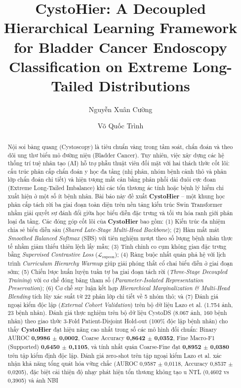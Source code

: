 \documentclass[runningheads]{llncs}
\begin{document}
%
\title{CystoHier: A Decoupled Hierarchical Learning Framework for Bladder Cancer Endoscopy Classification on Extreme Long-Tailed Distributions}
%
%
\author{Nguyễn Xuân Cường \and
Võ Quốc Trình}
%
%
%
\maketitle              %
%
\begin{abstract}
Nội soi bàng quang (Cystoscopy) là tiêu chuẩn vàng trong tầm soát, chẩn đoán và theo dõi ung thư biểu mô đường niệu (Bladder Cancer). Tuy nhiên, việc xây dựng các hệ thống trí tuệ nhân tạo (AI) hỗ trợ phẫu thuật viên đối mặt với hai thách thức cốt lõi: cấu trúc phân cấp chẩn đoán y học đa tầng (nhị phân, nhóm bệnh cảnh thô và phân lớp chẩn đoán chi tiết) và hiện tượng mất cân bằng phân phối dài đuôi cực đoan (Extreme Long-Tailed Imbalance) khi các tổn thương ác tính hoặc bệnh lý hiếm chỉ xuất hiện ở một số ít bệnh nhân. Bài báo này đề xuất \textbf{CystoHier} -- một khung học phân cấp tách rời ba giai đoạn toàn diện trên nền tảng kiến trúc Swin Transformer nhằm giải quyết sự đánh đổi giữa học biểu diễn đặc trưng và tối ưu hóa ranh giới phân loại đa tầng. Các đóng góp cốt lõi của \textbf{CystoHier} bao gồm: (1) Kiến trúc đa nhiệm chia sẻ biểu diễn sâu (\textit{Shared Late-Stage Multi-Head Backbone}); (2) Hàm mất mát \textit{Smoothed Balanced Softmax} (SBS) với tiên nghiệm mượt theo số lượng bệnh nhân thực tế nhằm giảm thiểu thiên lệch lấy mẫu; (3) Tinh chỉnh co cụm không gian đặc trưng bằng \textit{Supervised Contrastive Loss} ($\mathcal{L}_{\text{supcon}}$); (4) Ràng buộc nhất quán phả hệ với lịch trình \textit{Curriculum Hierarchy Warmup} giúp giải phóng thắt cổ chai biểu diễn ở giai đoạn sớm; (5) Chiến lược huấn luyện tuần tự ba giai đoạn tách rời (\textit{Three-Stage Decoupled Training}) với cơ chế đóng băng tham số (\textit{Parameter-Isolated Representation Preservation}); (6) Cơ chế suy luận kết hợp \textit{Hierarchical Marginalization \& Multi-Head Blending} tích lũy xác suất từ 22 phân lớp chi tiết về 5 nhóm thô; và (7) Đánh giá ngoại kiểm độc lập (\textit{External Cohort Validation}) trên bộ dữ liệu Lazo et al. (1.754 ảnh, 23 bệnh nhân). Đánh giá thực nghiệm trên bộ dữ liệu CystoDS (8.067 ảnh, 160 bệnh nhân) theo giao thức 3-Fold Patient-Disjoint Hold-out (100\% độc lập bệnh nhân) cho thấy \textbf{CystoHier} đạt hiệu năng cao nhất trong số các mô hình đối chuẩn: Binary AUROC \textbf{0,9986 $\pm$ 0,0002}, Coarse Accuracy \textbf{0,8642 $\pm$ 0,0352}, Fine Macro-F1 (Supported) \textbf{0,6450 $\pm$ 0,1105}, và tính nhất quán Coarse-Fine đạt \textbf{0,8952 $\pm$ 0,0380} trên tập kiểm định độc lập. Đánh giá zero-shot trên tập ngoại kiểm Lazo et al. xác nhận khả năng tổng quát hóa vững chắc (AUROC 0,9587 $\pm$ 0,0118, Accuracy 0,8537 $\pm$ 0,0205), đặc biệt cải thiện độ nhạy phát hiện tổn thương không tạo u NTL (0,4602 vs 0,3905) và ảnh NBI 
\end{abstract}
\end{document}
